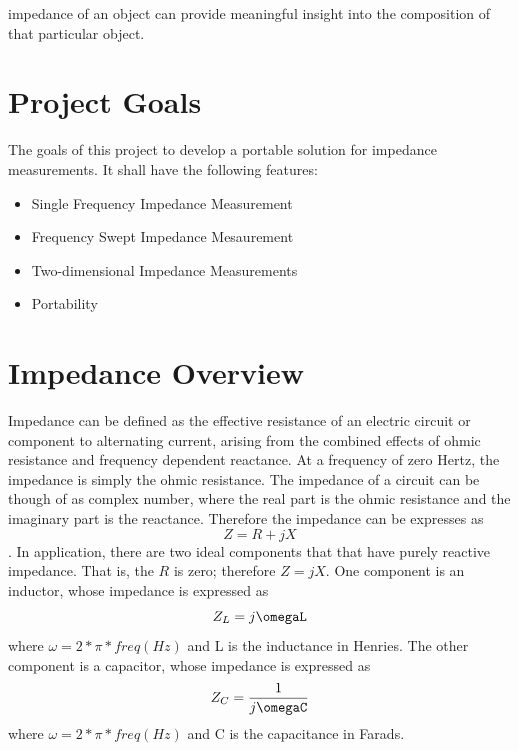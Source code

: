 \documentclass[]{IEEEtran}
\begin{document}
 impedance of an object can provide meaningful insight into the composition of that particular object. 
\newline 


\section{Project Goals}
The goals of this project to develop a portable solution for impedance measurements. It shall have the following features:
\begin{itemize}
\item{Single Frequency Impedance Measurement}%
\item{Frequency Swept Impedance Mesaurement}
\item{Two-dimensional Impedance Measurements}
\item{Portability}
\end{itemize}


\section{Impedance Overview}
Impedance can be defined as the effective resistance of an electric circuit or component to alternating current, arising from the combined effects of ohmic resistance and frequency dependent reactance. At a frequency of zero Hertz, the impedance is simply the ohmic resistance. The impedance of a circuit can be though of as complex number, where the real part is the ohmic resistance and the imaginary part is the reactance. Therefore the impedance can be expresses as \[Z=R+jX\]. In application, there are two ideal components that that have purely reactive impedance. That is, the \(R\) is zero; therefore \(Z=jX\). One component is an inductor, whose impedance is expressed as \[Z_L=j\omegaL\] where \(\omega=2*\pi*freq(Hz)\) and L is the inductance in Henries. The other component is a capacitor, whose impedance is expressed as \[Z_C=\frac{1}{j\omegaC}\] where \(\omega=2*\pi*freq(Hz)\) and C is the capacitance in Farads.\newline
\end{document}
